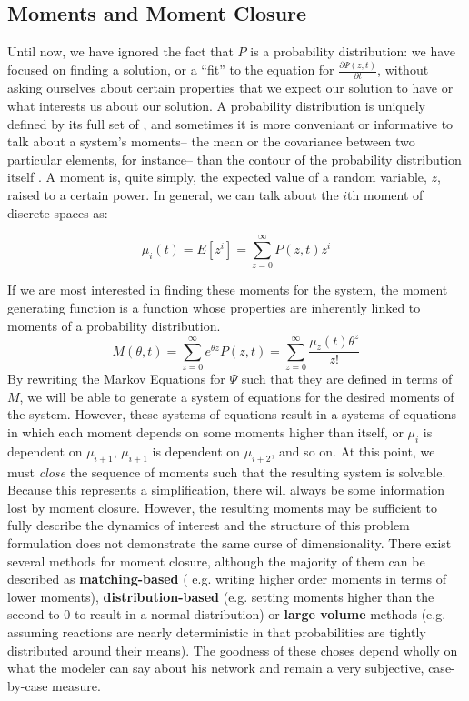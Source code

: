 \documentclass[en]{jdoc}
\begin{document}
\subsection{Moments and Moment Closure}
Until now, we have ignored the fact that $P$ is a probability distribution: we have focused on finding a solution, or a ``fit'' to the equation for $\frac{\partial \Psi(z,t)}{\partial t}$, without asking ourselves about certain properties that we expect our solution to have or what interests us about our solution. A probability distribution is uniquely defined by its full set of , and sometimes it is more conveniant or informative to talk about a system's moments-- the mean or the covariance between two particular elements, for instance-- than the contour of the probability distribution itself \cite{milner2011moment}. A moment is, quite simply, the expected value of a random variable, $z$, raised to a certain power. In general, we can talk about the $i$th moment of discrete spaces as:

$$ \mu_i (t) = E\left[ z^i \right] = \sum_{z=0}^\infty P(z,t) z^i$$

If we are most interested in finding these moments for the system, the moment generating function is a function whose properties are inherently linked to moments of a probability distribution.
$$M(\theta, t)=\sum_{z=0}^\infty e^{\theta z} P(z,t)=\sum_{z=0}^\infty \frac{\mu_z(t)\theta^z}{z!}$$
By rewriting the Markov Equations for $\Psi$ such that they are defined in terms of $M$, we will be able to generate a system of equations for the desired moments of the system. However, these systems of equations result in a systems of equations in which each moment depends on some moments higher than itself, or $\mu_i$ is dependent on $\mu_{i+1}$, $\mu_{i+1}$ is dependent on $\mu_{i+2}$, and so on. At this point, we must \textit{close} the sequence of moments such that the resulting system is solvable. Because this represents a simplification, there will always be some information lost by moment closure. However, the resulting moments may be sufficient to fully describe the dynamics of interest and the structure of this problem formulation does not demonstrate the same curse of dimensionality.
There exist several methods for moment closure, although the majority of them can be described as \textbf{matching-based} ( e.g. writing higher order moments in terms of lower moments), \textbf{distribution-based} (e.g. setting moments higher than the second to 0 to result in a normal distribution) or \textbf{large volume} methods (e.g. assuming reactions are nearly deterministic in that probabilities are tightly distributed around their means). The goodness of these choses depend wholly on what the modeler can say about his network and remain a very subjective, case-by-case measure.
\end{document}
